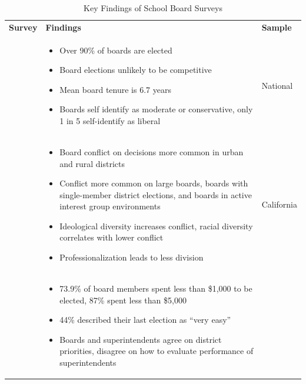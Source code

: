 \begin{small}
\begin{singlespace}
\begin{longtable}{| p{} | p{} | p{}|}
\hline

\caption{Key Findings of School Board Surveys} 
\label{sbsurveys2}\\ \hline
\textbf{Survey}  & \textbf{Findings} & \textbf{Sample} \\ \hline \endhead
\citet{RefWorks:321}  &  \vspace{-6mm} \begin{itemize} \setlength\itemsep{-2pt}
\item Over 90\% of boards are elected 
\item Board elections unlikely to be competitive \item Mean board tenure is 6.7 years 
\item Boards self identify as moderate or conservative, only 1 in 5 self-identify as liberal 
\end{itemize} \vspace{-4mm} & National \\ \hline
\citet{RefWorks:264} & \vspace{-6mm} \begin{itemize} \setlength\itemsep{-2pt}
\item Board conflict on decisions more 
common in urban and rural districts \item Conflict more common on large boards, boards with single-member district elections, 
and boards in active interest group environments \item Ideological diversity increases conflict, racial diversity correlates 
with lower conflict \item Professionalization leads to less division 
\end{itemize} \vspace{-4mm} & California \\ \hline
\citet{RefWorks:322} & \vspace{-6mm} \begin{itemize}
\setlength\itemsep{-2pt}\item 73.9\% of board members spent less than \$1,000
to be elected, 87\% spent less than \$5,000 \item 44\% described their last election as ``very easy'' \item Boards and 
superintendents agree on district priorities, disagree on how to evaluate performance of superintendents

\end{itemize}
\end{longtable}
\end{singlespace}
\end{small}
